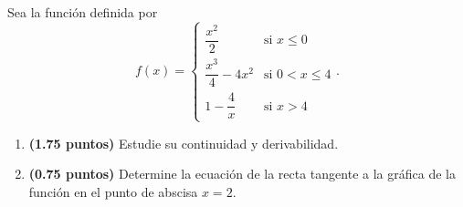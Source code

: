 
Sea la función definida por
\[
f(x)=\begin{cases}\dfrac{x^2}{2}&\text{si }x\leq0\\[0.8em]\dfrac{x^3}{4}-4x^2&\text{si }0<x\leq4\\[0.8em]1-\dfrac{4}{x}&\text{si }x>4\end{cases}.
\]
\begin{enumerate}[label=\alph*)]
\item \textbf{(1.75 puntos)} Estudie su continuidad y derivabilidad.
\item \textbf{(0.75 puntos)} Determine la ecuación de la recta tangente a la gráfica de la función en el punto de abscisa $x=2$.
\end{enumerate}
